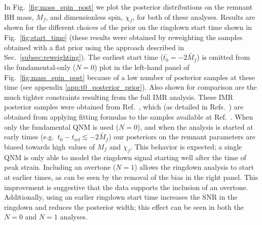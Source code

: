 In Fig.~\ref{fig:mass_spin_post} we plot the posterior distributions on the remnant BH mass, $M_f$, and dimensionless spin, $\chi_f$, for both of these analyses.
Results are shown for the different choices of the prior on the ringdown start time shown in Fig.~\ref{fig:start_time} (these results were obtained by reweighting the samples obtained with a flat prior using the approach described in Sec.~\ref{subsec:reweighting}).
The earliest start time ($\bar{t_0}=-2\tilde{M_f}$) is omitted from the fundamental-only ($N=0$) plot in the left-hand panel of Fig.~\ref{fig:mass_spin_post} because of a low number of posterior samples at these time (see appendix \ref{app:t0_posterior_prior}).
Also shown for comparison are the much tighter constraints resulting from the full IMR analysis.
These IMR posterior samples were obtained from Ref.~\cite{maximiliano_isi_2022_5965773}, which (as detailed in Refs.~\cite{Isi:2019aib,Isi:2022mhy}) are obtained from applying fitting formulas to the samples available at Ref.~\cite{gwtc1datarelease}. 
When only the fundamental QNM is used ($N=0$), and when the analysis is started at early times (e.g.\ $t_0 - t_\mathrm{ref}\lesssim -2\tilde{M_f}$) our posteriors on the remnant parameters are biased towards high values of $M_f$ and $\chi_f$.
This behavior is expected; a single QNM is only able to model the ringdown signal starting well after the time of peak strain.
Including an overtone ($N=1$) allows the ringdown analysis to start at earlier times, as can be seen by the removal of the bias in the right panel. 
This improvement is suggestive that the data supports the inclusion of an overtone.
Additionally, using an earlier ringdown start time increases the SNR in the ringdown and reduces the posterior width; this effect can be seen in both the $N=0$ and $N=1$ analyses.

